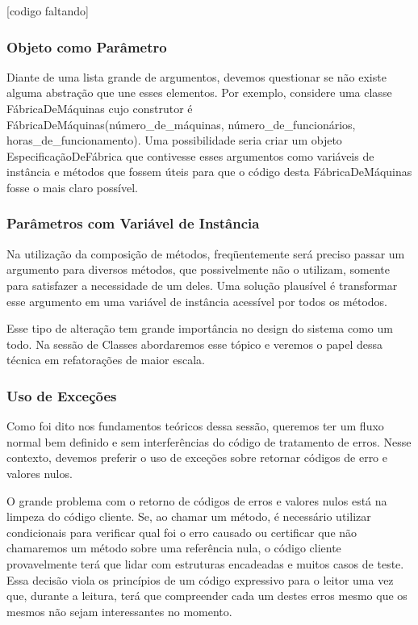 [codigo faltando]

\subsubsection{Objeto como Parâmetro}
 	Diante de uma lista grande de argumentos, devemos questionar se não existe alguma abstração que une esses elementos. Por exemplo, considere uma classe FábricaDeMáquinas cujo construtor é FábricaDeMáquinas(número_de_máquinas, número_de_funcionários, horas_de_funcionamento). Uma possibilidade seria criar um objeto EspecificaçãoDeFábrica que contivesse esses argumentos como variáveis de instância e métodos que fossem úteis para que o código desta FábricaDeMáquinas fosse o mais claro possível.

\subsubsection{Parâmetros com Variável de Instância}
	Na utilização da composição de métodos, freqüentemente será preciso passar um argumento para diversos métodos, que possivelmente não o utilizam, somente para satisfazer a necessidade de um deles. Uma solução plausível é transformar esse argumento em uma variável de instância acessível por todos os métodos.
	
	Esse tipo de alteração tem grande importância no design do sistema como um todo. Na sessão de Classes abordaremos esse tópico e veremos o papel dessa técnica em refatorações de maior escala.

\subsubsection{Uso de Exceções}
	Como foi dito nos fundamentos teóricos dessa sessão, queremos ter um fluxo normal bem definido e sem interferências do código de tratamento de erros. Nesse contexto, devemos preferir o uso de exceções sobre retornar códigos de erro e valores nulos.
	
	O grande problema com o retorno de códigos de erros e valores nulos está na limpeza do código cliente. Se, ao chamar um método, é necessário utilizar condicionais para verificar qual foi o erro causado ou certificar que não chamaremos um método sobre uma referência nula, o código cliente provavelmente terá que lidar com estruturas encadeadas e muitos casos de teste. Essa decisão viola os princípios de um código expressivo para o leitor uma vez que, durante a leitura, terá que compreender cada um destes erros mesmo que os mesmos não sejam interessantes no momento.

